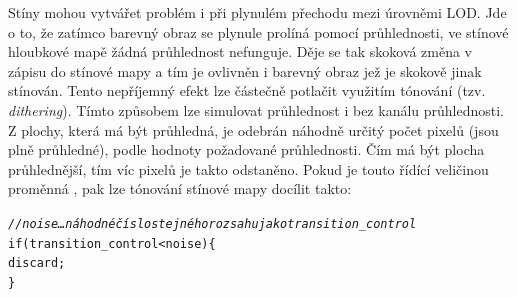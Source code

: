 Stíny mohou vytvářet problém i při plynulém přechodu mezi úrovněmi LOD. Jde o to, že zatímco barevný obraz se plynule prolíná pomocí průhlednosti, ve stínové hloubkové mapě žádná průhlednost nefunguje. Děje se tak skoková změna v zápisu do stínové mapy a tím je ovlivněn i barevný obraz jež je skokově jinak stínován. Tento nepříjemný efekt lze částečně potlačit využitím tónování (tzv. \emph{dithering}). Tímto způsobem lze simulovat průhlednost i bez kanálu průhlednosti. Z plochy, která má být průhledná, je odebrán náhodně určitý počet pixelů (jsou plně průhledné), podle hodnoty požadované průhlednosti. Čím má být plocha průhlednější, tím víc pixelů je takto odstaněno. Pokud je touto řídící veličinou proměnná , pak lze tónování stínové mapy docílit takto:
\begin{alltt}
\textit{// noise\dots náhodné číslo stejného rozsahu jako transition\_control}
    if ( transition_control < noise ) \{
        discard;
    \}
\end{alltt}
